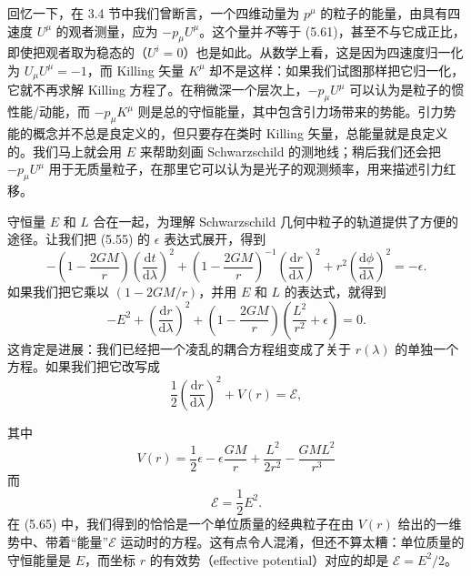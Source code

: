 回忆一下，在 3.4 节中我们曾断言，一个四维动量为 $p^\mu$ 的粒子的能量，由具有四速度 $U^\mu$ 的观者测量，应为 $-p_\mu U^\mu$。这个量并\emph{不}等于 (5.61)，甚至不与它成正比，即使把观者取为稳态的（$U^i = 0$）也是如此。从数学上看，这是因为四速度归一化为 $U_\mu U^\mu = -1$，而 Killing 矢量 $K^\mu$ 却不是这样：如果我们试图那样把它归一化，它就不再求解 Killing 方程了。在稍微深一个层次上，$-p_\mu U^\mu$ 可以认为是粒子的惯性能/动能，而 $-p_\mu K^\mu$ 则是总的守恒能量，其中包含引力场带来的势能。引力势能的概念并不总是良定义的，但只要存在类时 Killing 矢量，总能量就是良定义的。我们马上就会用 $E$ 来帮助刻画 Schwarzschild 的测地线；稍后我们还会把 $-p_\mu U^\mu$ 用于无质量粒子，在那里它可以认为是光子的观测频率，用来描述引力红移。

守恒量 $E$ 和 $L$ 合在一起，为理解 Schwarzschild 几何中粒子的轨道提供了方便的途径。让我们把 (5.55) 的 $\epsilon$ 表达式展开，得到
\begin{equation*}
-\left(1-\frac{2GM}{r}\right)\left(\frac{\mathrm{d}t}{\mathrm{d}\lambda}\right)^2 + \left(1-\frac{2GM}{r}\right)^{-1}\left(\frac{\mathrm{d}r}{\mathrm{d}\lambda}\right)^2 + r^2\left(\frac{\mathrm{d}\phi}{\mathrm{d}\lambda}\right)^2 = -\epsilon.
\tag{5.63}
\end{equation*}
如果我们把它乘以 $(1-2GM/r)$，并用 $E$ 和 $L$ 的表达式，就得到
\begin{equation*}
-E^2 + \left(\frac{\mathrm{d}r}{\mathrm{d}\lambda}\right)^2 + \left(1-\frac{2GM}{r}\right)\left(\frac{L^2}{r^2}+\epsilon\right) = 0.
\tag{5.64}
\end{equation*}
这肯定是进展：我们已经把一个凌乱的耦合方程组变成了关于 $r(\lambda)$ 的单独一个方程。如果我们把它改写成
\begin{equation*}
\frac{1}{2}\left(\frac{\mathrm{d}r}{\mathrm{d}\lambda}\right)^2 + V(r) = \mathcal{E},
\tag{5.65}
\end{equation*}

其中
\begin{equation*}
V(r) = \frac{1}{2}\epsilon - \epsilon\frac{GM}{r} + \frac{L^2}{2r^2} - \frac{GML^2}{r^3}
\tag{5.66}
\end{equation*}
而
\begin{equation*}
\mathcal{E} = \frac{1}{2}E^2.
\tag{5.67}
\end{equation*}
在 (5.65) 中，我们得到的恰恰是一个单位质量的经典粒子在由 $V(r)$ 给出的一维势中、带着“能量”$\mathcal{E}$ 运动时的方程。这有点令人混淆，但还不算太糟：单位质量的守恒能量是 $E$，而坐标 $r$ 的有效势（effective potential）对应的却是 $\mathcal{E} = E^2/2$。

